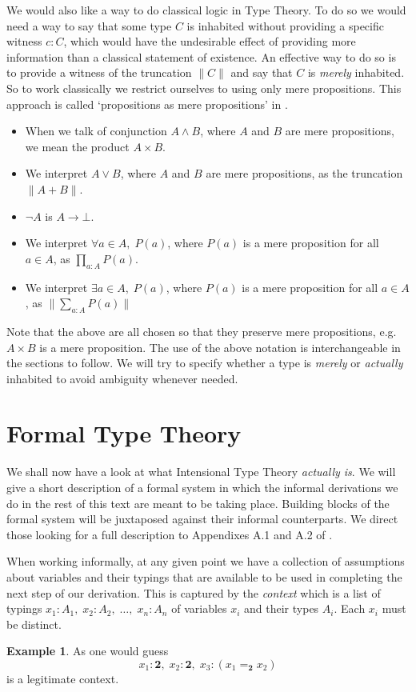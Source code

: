 \documentclass[12pt]{report}
\theoremstyle{definition}
\newtheorem{exmp}[thm]{Example}
\begin{document}
We would also like a way to do classical logic in Type Theory. 
To do so we would need a way to say that some type $C$ is inhabited without providing a specific witness $c : C$, which would have the undesirable effect of providing more information than a classical statement of existence. 
An effective way to do so is to provide a witness of the truncation $\lVert C \rVert$ and say that $C$ is \textit{merely} inhabited. 
So to work classically we restrict ourselves to using only mere propositions. 
This approach is called `propositions as mere propositions' in \cite{hottbook}. 
\begin{itemize}
\item When we talk of conjunction $A \wedge B$, where $A$ and $B$ are mere propositions, we mean the product $A \times B$. 
\item We interpret $A \vee B$, where $A$ and $B$ are mere propositions, as the truncation $\| A + B\|$.
\item $\neg A$ is $A \rightarrow \bot$. 
\item We interpret $\forall a\in A,\; P(a)$, where $P(a)$ is a mere proposition for all $a \in A$, as $\prod_{a : A}P(a)$. 
\item We interpret $ \exists a \in A,\; P(a)$, where $P(a)$ is a mere proposition for all $a \in A$, as $\| \sum_{a : A} P(a) \|$
\end{itemize}
Note that the above are all chosen so that they preserve mere propositions, e.g. $A\times B$ is a mere proposition. 
The use of the above notation is interchangeable in the sections to follow. 
We will try to specify whether a type is \textit{merely} or \textit{actually} inhabited to avoid ambiguity whenever needed. 
\section{Formal Type Theory}\label{formalTT}
We shall now have a look at what Intensional Type Theory \textit{actually is}. 
We will give a short description of a formal system in which the informal derivations we do in the rest of this text are meant to be taking place. 
Building blocks of the formal system will be juxtaposed against their informal counterparts. 
We direct those looking for a full description to Appendixes A.1 and A.2 of \cite{hottbook}.

When working informally, at any given point we have a collection of assumptions about variables and their typings that are available to be used in completing the next step of our derivation. 
This is captured by the \textit{context} which is a list of typings $x_1 : A_1,\; x_2 : A_2,\;\ldots,\;x_n : A_n$ of variables $x_i$ and their types $A_i$. 
Each $x_i$ must be distinct. 
\begin{exmp}
As one would guess
$$x_1 : \mathbf{2},\; x_2 : \mathbf{2},\; x_3 : (x_1=_\mathbf{2} x_2)$$
is a legitimate context. 
\end{exmp}
\end{document}
